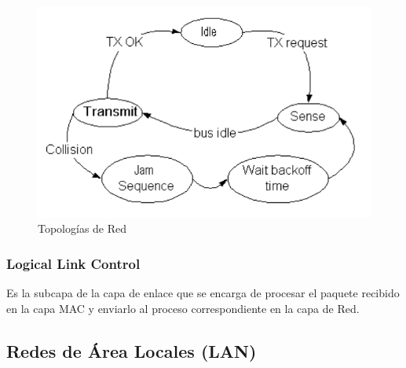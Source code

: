 \begin{figure}[H]
	\centering
	\includegraphics[width=\textwidth
]{images/csma-cd.png}
	\caption[Topologías de Red]{Topologías de Red}
	\label{fig:csma-cd}
\end{figure}

\subsubsection{Logical Link Control}
Es la subcapa de la capa de enlace que se encarga de procesar el paquete recibido en la capa MAC y enviarlo al proceso correspondiente en la capa de Red.

\subsection{Redes de Área Locales (LAN)}
